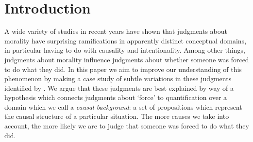 \documentclass{salt}
\begin{document}
\section{Introduction}

A wide variety of studies in recent years have shown that judgments about morality have surprising ramifications in apparently distinct conceptual domains, in particular having to do with causality and intentionality. Among other things, judgments about morality influence judgments about whether someone was forced to do what they did. In this paper we aim to improve our understanding of this phenomenon by making a case study of subtle variations in these judgments identified by \citet{young2011paradox}. We argue that these judgments are best explained by way of a hypothesis which connects judgments about `force' to quantification over a domain which we call a \emph{causal background}: a set of propositions which represent the causal structure of a particular situation. The more causes we take into account, the more likely we are to judge that someone was forced to do what they did.


\end{document}
